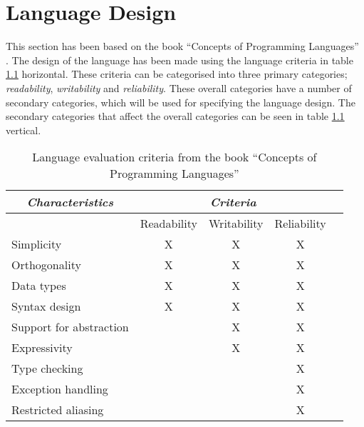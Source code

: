 \chapter{Language Design}
This section has been based on the book ``Concepts of Programming Languages'' \cite{CoPL}. The design of the language has been made using the language criteria in table \ref{tbl:evaluation criteria} horizontal. These criteria can be categorised into three primary categories; \textit{readability}, \textit{writability} and \textit{reliability}. These overall categories have a number of secondary categories, which will be used for specifying the language design. The secondary categories that affect the overall categories can be seen in table \ref{tbl:evaluation criteria} vertical.

\begin{table}[htbp]
\centering
\begin{tabular}{|l|c|c|c|c|}
\hline
\multicolumn{1}{|c|}{\textit{Characteristics}} & \multicolumn{3}{|c|}{\textit{Criteria}} \\ \hline
& Readability & Writability & Reliability \\ \hline
Simplicity & X & X & X \\ \hline
Orthogonality & X & X & X \\ \hline
Data types & X & X & X \\ \hline
Syntax design & X & X & X  \\ \hline
Support for abstraction & & X & X  \\ \hline
Expressivity & & X & X \\ \hline
Type checking & & & X \\ \hline
Exception handling & & & X \\ \hline
Restricted aliasing & & & X \\ \hline
\end{tabular}
\caption{Language evaluation criteria from the book ``Concepts of Programming Languages''\cite{CoPL}}
\label{tbl:evaluation criteria}
\end{table}

